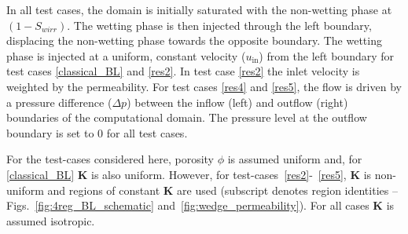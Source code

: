 \documentclass[times]{fldauth}
\begin{document}
In all test cases, the domain is initially saturated with the
non-wetting phase at $(1- S_{wirr}).$ The wetting phase is then
injected through the left boundary, displacing the non-wetting phase
towards the opposite boundary. The wetting phase is injected at a
uniform, constant velocity ($u_{\mathrm{in}}$) from the left boundary
for test cases  \ref{classical_BL} and  \ref{res2}. In test case \ref{res2} the
inlet velocity is weighted by the permeability. For test cases  \ref{res4} and  \ref{res5},
the flow is driven by a pressure difference ($\Delta p$)
between the inflow (left) and outflow (right) boundaries of the
computational domain. The pressure level at the outflow boundary is
set to 0 for all test cases.

For the test-cases considered here, porosity $\phi$ is assumed uniform and, for \ref{classical_BL} $\mathbf{K}$ is also uniform. However, for test-cases~\ref{res2}-~\ref{res5}, $\mathbf{K}$ is non-uniform and regions of constant $\mathbf{K}$ are used (subscript denotes region identities -- Figs.~\ref{fig:4reg_BL_schematic} and~\ref{fig:wedge_permeability}). For all cases $\mathbf{K}$ is assumed isotropic.
\end{document}
